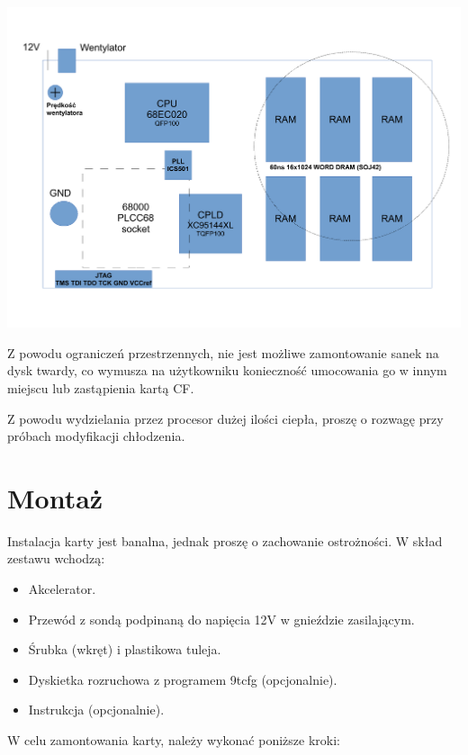 \documentclass[10pt,a5paper]{article}
\begin{document}
\begin{center}
\includegraphics[scale=0.35]{ninetails-drawing_PL.pdf}
\end{center}

Z powodu ograniczeń przestrzennych, nie jest możliwe zamontowanie sanek na dysk twardy, co wymusza na użytkowniku konieczność
umocowania go w innym miejscu lub zastąpienia kartą CF. 

Z powodu wydzielania przez procesor dużej ilości ciepła, proszę o rozwagę przy próbach modyfikacji chłodzenia.

\section*{Montaż}

Instalacja karty jest banalna, jednak proszę o zachowanie ostrożności. W skład zestawu wchodzą:

\begin{itemize}\itemsep0pt
	\item Akcelerator.
	\item Przewód z sondą podpinaną do napięcia 12V w gnieździe zasilającym.
	\item Śrubka (wkręt) i  plastikowa tuleja.
	\item Dyskietka rozruchowa z programem 9tcfg (opcjonalnie).
	\item Instrukcja (opcjonalnie).
\end{itemize}

\noindent W celu zamontowania karty, należy wykonać poniższe kroki:
\end{document}
